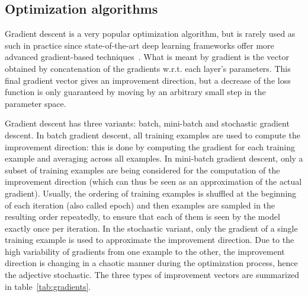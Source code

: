     \subsection{Optimization algorithms} \label{opti}

        Gradient descent is a very popular optimization algorithm,
        but is rarely used as such in practice since state-of-the-art deep learning
        frameworks offer more advanced gradient-based techniques~\cite{DBLP:journals/corr/Ruder16}.
        What is meant by gradient is the vector obtained by concatenation of the gradients
        w.r.t. each layer's parameters. This final gradient vector
        gives an improvement direction, but a decrease of the loss function
        is only guaranteed by moving by an arbitrary small step in the parameter space.

        Gradient descent has three variants: batch, mini-batch and stochastic gradient descent.
        In batch gradient descent, all training examples are used to compute the improvement
        direction: this is done by computing the gradient for each training example and averaging
        across all examples. In mini-batch gradient descent, only a subset of training examples
        are being considered for the computation of the improvement direction
        (which can thus be seen as an approximation of the actual gradient). Usually, the ordering
        of training examples is shuffled at the beginning of each iteration (also called epoch)
        and then examples are sampled in the resulting order repeatedly,
        to ensure that each of them is seen by the model exactly once per iteration.
        In the stochastic variant, only the gradient of a single training example is used to
        approximate the improvement direction. Due to the high variability of gradients from one
        example to the other, the improvement direction is changing in a chaotic manner during
        the optimization process, hence the adjective stochastic.
        The three types of improvement vectors are summarized in table~\ref{tab:gradients}.

